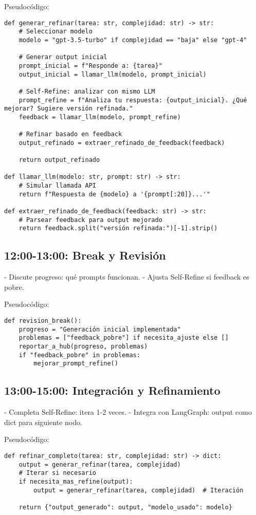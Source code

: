 \documentclass{article}
\begin{document}
Pseudocódigo:
\begin{lstlisting}
def generar_refinar(tarea: str, complejidad: str) -> str:
    # Seleccionar modelo
    modelo = "gpt-3.5-turbo" if complejidad == "baja" else "gpt-4"
    
    # Generar output inicial
    prompt_inicial = f"Responde a: {tarea}"
    output_inicial = llamar_llm(modelo, prompt_inicial)
    
    # Self-Refine: analizar con mismo LLM
    prompt_refine = f"Analiza tu respuesta: {output_inicial}. ¿Qué mejorar? Sugiere versión refinada."
    feedback = llamar_llm(modelo, prompt_refine)
    
    # Refinar basado en feedback
    output_refinado = extraer_refinado_de_feedback(feedback)
    
    return output_refinado

def llamar_llm(modelo: str, prompt: str) -> str:
    # Simular llamada API
    return f"Respuesta de {modelo} a '{prompt[:20]}...'"

def extraer_refinado_de_feedback(feedback: str) -> str:
    # Parsear feedback para output mejorado
    return feedback.split("versión refinada:")[-1].strip()
\end{lstlisting}

\subsection{12:00-13:00: Break y Revisión}
- Discute progreso: qué prompts funcionan.
- Ajusta Self-Refine si feedback es pobre.

Pseudocódigo:
\begin{lstlisting}
def revision_break():
    progreso = "Generación inicial implementada"
    problemas = ["feedback_pobre"] if necesita_ajuste else []
    reportar_a_hub(progreso, problemas)
    if "feedback_pobre" in problemas:
        mejorar_prompt_refine()
\end{lstlisting}

\subsection{13:00-15:00: Integración y Refinamiento}
- Completa Self-Refine: itera 1-2 veces.
- Integra con LangGraph: output como dict para siguiente nodo.

Pseudocódigo:
\begin{lstlisting}
def refinar_completo(tarea: str, complejidad: str) -> dict:
    output = generar_refinar(tarea, complejidad)
    # Iterar si necesario
    if necesita_mas_refine(output):
        output = generar_refinar(tarea, complejidad)  # Iteración
    
    return {"output_generado": output, "modelo_usado": modelo}
\end{lstlisting}
\end{document}
